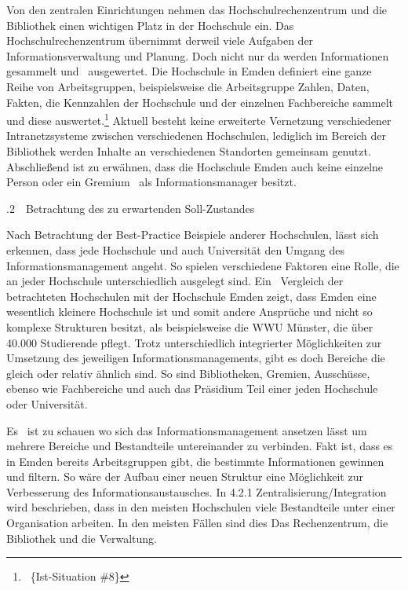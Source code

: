 \documentclass{article}
\begin{document}
Von den zentralen Einrichtungen nehmen das Hochschulrechenzentrum und die Bibliothek einen wichtigen Platz in der
Hochschule ein. Das Hochschulrechenzentrum übernimmt derweil viele Aufgaben der Informationsverwaltung und Planung.
Doch nicht nur da werden Informationen gesammelt und \ ausgewertet. Die Hochschule in Emden definiert eine ganze Reihe
von Arbeitsgruppen, beispielsweise die Arbeitsgruppe Zahlen, Daten, Fakten, die Kennzahlen der Hochschule und der
einzelnen Fachbereiche sammelt und diese auswertet.\footnote{\ \{Ist-Situation \#8\}} Aktuell besteht keine erweiterte
Vernetzung verschiedener Intranetzsysteme zwischen verschiedenen Hochschulen, lediglich im Bereich der Bibliothek
werden Inhalte an verschiedenen Standorten gemeinsam genutzt. Abschließend ist zu erwähnen, dass die Hochschule Emden
auch keine einzelne Person oder ein Gremium \ als Informationsmanager besitzt.


\bigskip


\bigskip

.2\ \ Betrachtung des zu erwartenden Soll-Zustandes


\bigskip

Nach Betrachtung der Best-Practice Beispiele anderer Hochschulen, lässt sich erkennen, dass jede Hochschule und auch
Universität den Umgang des Informationsmanagement angeht. So spielen verschiedene Faktoren eine Rolle, die an jeder
Hochschule unterschiedlich ausgelegt sind. Ein \ Vergleich der betrachteten Hochschulen mit der Hochschule Emden zeigt,
dass Emden eine wesentlich kleinere Hochschule ist und somit andere Ansprüche und nicht so komplexe Strukturen besitzt,
als beispielsweise die WWU Münster, die über 40.000 Studierende pflegt. Trotz unterschiedlich integrierter
Möglichkeiten zur Umsetzung des jeweiligen Informationsmanagements, gibt es doch Bereiche die gleich oder relativ
ähnlich sind. So sind Bibliotheken, Gremien, Ausschüsse, ebenso wie Fachbereiche und auch das Präsidium Teil einer
jeden Hochschule oder Universität. 

Es \ ist zu schauen wo sich das Informationsmanagement ansetzen lässt um mehrere Bereiche und Bestandteile untereinander
zu verbinden. Fakt ist, dass es in Emden bereits Arbeitsgruppen gibt, die bestimmte Informationen gewinnen und filtern.
So wäre der Aufbau einer neuen Struktur eine Möglichkeit zur Verbesserung des Informationsaustausches. In 4.2.1
Zentralisierung/Integration wird beschrieben, dass in den meisten Hochschulen viele Bestandteile unter einer
Organisation arbeiten. In den meisten Fällen sind dies Das Rechenzentrum, die Bibliothek und die Verwaltung.
\end{document}
